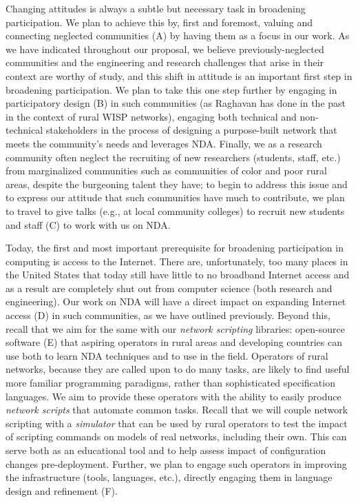 \documentclass[10pt]{article}
\begin{document}
Changing attitudes is always a subtle but necessary task in broadening participation.  We plan to achieve this by, first and foremost, valuing and connecting neglected communities (A) by having them as a focus in our work.  As we have indicated throughout our proposal, we believe previously-neglected communities and the engineering and research challenges that arise in their context are worthy of study, and this shift in attitude is an important first step in broadening participation.  We plan to take this one step further by engaging in participatory design (B) in such communities (as Raghavan has done in the past in the context of rural WISP networks), engaging both technical and non-technical stakeholders in the process of designing a purpose-built network that meets the community's needs and leverages NDA.  Finally, we as a research community often neglect the recruiting of new researchers (students, staff, etc.) from marginalized communities such as communities of color and poor rural areas, despite the burgeoning talent they have; to begin to address this issue and to express our attitude that such communities have much to contribute, we plan to travel to give talks (e.g., at local community colleges) to recruit new students and staff (C) to work with us on NDA.

Today, the first and most important prerequisite for broadening participation in computing is access to the Internet.  There are, unfortunately, too many places in the United States that today still have little to no broadband Internet access and as a result are completely shut out from computer science (both research and engineering).  Our work on NDA will have a direct impact on expanding Internet access (D) in such communities, as we have outlined previously.
Beyond this, recall that we aim for the same with our \emph{network scripting} libraries: open-source software (E) that aspiring operators in rural areas and developing countries can use both to learn NDA techniques and to use in the field.  Operators of rural networks, because they are called upon to do many tasks, are likely to find useful more familiar programming paradigms, rather than sophisticated specification languages.  We aim to provide these operators with the ability to easily produce \emph{network scripts} that automate common tasks.  Recall that we will couple network scripting with a \emph{simulator} that can be used by rural operators to test the impact of scripting commands on models of real networks, including their own. This can serve both as an educational tool and to help assess impact of configuration changes pre-deployment.  Further, we plan to engage such operators in improving the infrastructure (tools, languages, etc.), directly engaging them in language design and refinement (F).
\end{document}
